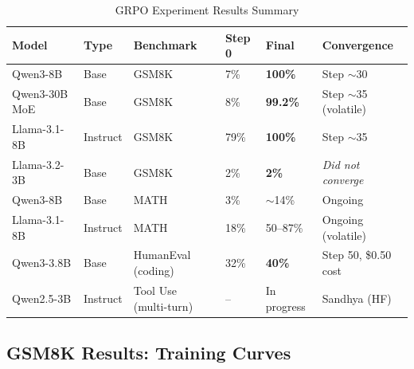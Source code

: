 \documentclass[12pt,a4paper]{report}
\theoremstyle{definition}
\begin{document}
\begin{table}[htbp]
\centering
\caption{GRPO Experiment Results Summary}
\label{tab:results_summary}
\begin{tabular}{llllll}
\toprule
\textbf{Model} & \textbf{Type} & \textbf{Benchmark} & \textbf{Step 0} & \textbf{Final} & \textbf{Convergence} \\
\midrule
Qwen3-8B       & Base          & GSM8K  & 7\%   & \textbf{100\%} & Step $\sim$30 \\
Qwen3-30B MoE  & Base          & GSM8K  & 8\%   & \textbf{99.2\%} & Step $\sim$35 (volatile) \\
Llama-3.1-8B   & Instruct      & GSM8K  & 79\%  & \textbf{100\%} & Step $\sim$35 \\
Llama-3.2-3B   & Base          & GSM8K  & 2\%   & \textbf{2\%}   & \textit{Did not converge} \\
Qwen3-8B       & Base          & MATH   & 3\%   & $\sim$14\%     & Ongoing \\
Llama-3.1-8B   & Instruct      & MATH   & 18\%  & 50--87\%       & Ongoing (volatile) \\
Qwen3-3.8B     & Base          & HumanEval (coding) & 32\% & \textbf{40\%} & Step 50, \$0.50 cost \\
Qwen2.5-3B     & Instruct      & Tool Use (multi-turn) & --  & In progress    & Sandhya (HF) \\
\bottomrule
\end{tabular}
\end{table}

\subsection{GSM8K Results: Training Curves}
\end{document}
